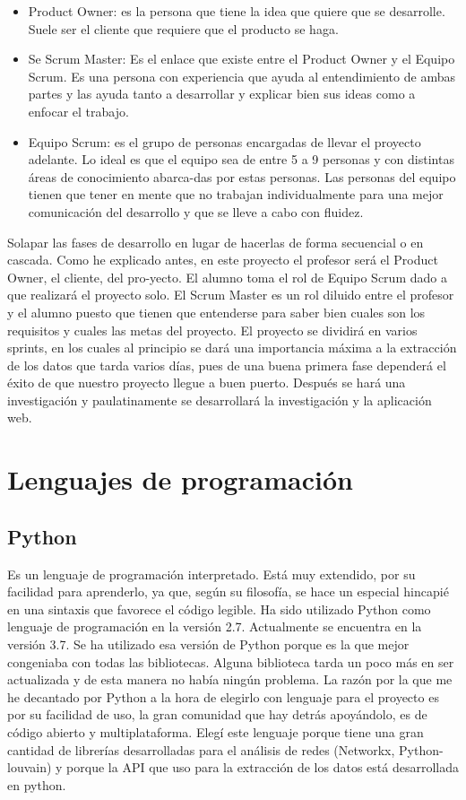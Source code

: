 \begin{itemize}
    \item Product Owner: es la persona que tiene la idea que quiere que se desarrolle. Suele ser el cliente que requiere que el producto se haga.
    \item Se Scrum Master: Es el enlace que existe entre el Product Owner y el Equipo Scrum. Es una persona con experiencia que ayuda al entendimiento de ambas partes y las ayuda tanto a desarrollar y explicar bien sus ideas como a enfocar el trabajo.
    \item Equipo Scrum: es el grupo de personas encargadas de llevar el proyecto adelante. Lo ideal es que el equipo sea de entre 5 a 9 personas y con distintas áreas de conocimiento abarca-das por estas personas. Las personas del equipo tienen que tener en mente que no trabajan individualmente para una mejor comunicación del desarrollo y que se lleve a cabo con fluidez.
\end{itemize}

Solapar las fases de desarrollo en lugar de hacerlas de forma secuencial
o en cascada. 
Como he explicado antes, en este proyecto el profesor será el Product Owner, el cliente, del pro-yecto. El alumno toma el rol de Equipo Scrum dado a que realizará el proyecto solo. El Scrum Master es un rol diluido entre el profesor y el alumno puesto que tienen que entenderse para saber bien cuales son los requisitos y cuales las metas del proyecto.
El proyecto se dividirá en varios sprints, en los cuales al principio se dará una importancia máxima a la extracción de los datos que tarda varios días, pues de una buena primera fase dependerá el éxito de que nuestro proyecto llegue a buen puerto.
Después se hará una investigación y paulatinamente se desarrollará la investigación y la aplicación web.


\section{Lenguajes de programación} 
\subsection{Python}
Es un lenguaje de programación interpretado. Está muy extendido, por su facilidad para aprenderlo, ya que, según su filosofía, se hace un especial hincapié en una sintaxis que favorece el código legible.
Ha sido utilizado Python como lenguaje de programación en la versión 2.7. Actualmente se encuentra en la versión 3.7. Se ha utilizado esa versión de Python porque es la que mejor congeniaba con todas las bibliotecas. Alguna biblioteca tarda un poco más en ser actualizada y de esta manera no había ningún problema.
La razón por la que me he decantado por Python a la hora de elegirlo con lenguaje para el proyecto es por su facilidad de uso, la gran comunidad que hay detrás apoyándolo, es de código abierto y multiplataforma. 
Elegí este lenguaje porque tiene una gran cantidad de librerías desarrolladas para el análisis de redes (Networkx, Python-louvain) y porque la API que uso para la extracción de los datos está desarrollada en python.
\cite{python}


